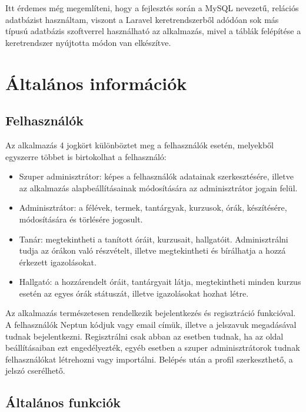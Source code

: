 \documentclass[
]{thesis-ekf}
\theoremstyle{definition}
\theoremstyle{remark}
\begin{document}
Itt érdemes még megemlíteni, hogy a fejlesztés során a MySQL\cite{mysql} nevezetű, relációs adatbázist használtam, viszont a Laravel keretrendszerből adódóan sok más típusú adatbázis szoftverrel használható az alkalmazás, mivel a táblák felépítése a keretrendszer nyújtotta módon van elkészítve.

\section{Általános információk}

\subsection{Felhasználók}
\label{users}

Az alkalmazás 4 jogkört különböztet meg a felhasználók esetén, melyekből egyszerre többet is birtokolhat a felhasználó:

\begin{itemize}
	\item Szuper adminisztrátor: képes a felhasználók adatainak szerkesztésére, illetve az alkalmazás alapbeállításainak módosítására az adminisztrátor jogain felül.
	\item Adminisztrátor: a félévek, termek, tantárgyak, kurzusok, órák, készítésére, módosítására és törlésére jogosult.
	\item Tanár: megtekintheti a tanított óráit, kurzusait, hallgatóit. Adminisztrálni tudja az órákon való részvételt, illetve megtekintheti és bírálhatja a hozzá érkezett igazolásokat.
	\item Hallgató: a hozzárendelt óráit, tantárgyait látja, megtekintheti minden kurzus esetén az egyes órák státuszát, illetve igazolásokat hozhat létre.
\end{itemize}

Az alkalmazás természetesen rendelkezik bejelentkezés és regisztráció funkcióval. A felhasználók Neptun\cite{Neptun} kódjuk vagy email címük, illetve a jelszavuk megadásával tudnak bejelentkezni. Regisztrálni csak abban az esetben tudnak, ha az oldal beállításaiban ezt engedélyezték, egyéb esetben a szuper adminisztrátorok tudnak felhasználókat létrehozni vagy importálni. Belépés után  a profil szerkeszthető, a jelszó cserélhető.

\subsection{Általános funkciók}
\end{document}
